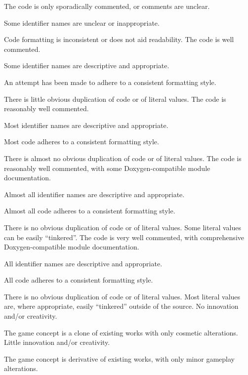 \documentclass{../fal_assignment}
\begin{document}
\begin{markingrubric}
        \grade The code is only sporadically commented, or comments are unclear.
            \par Some identifier names are unclear or inappropriate.
            \par Code formatting is inconsistent or does not aid readability.
        \grade The code is well commented.
            \par Some identifier names are descriptive and appropriate.
            \par An attempt has been made to adhere to a consistent formatting style.
             \par There is little obvious duplication of code or of literal values.           
        \grade The code is reasonably well commented.
            \par Most identifier names are descriptive and appropriate.
            \par Most code adheres to a consistent formatting style.
             \par There is almost no obvious duplication of code or of literal values.   
        \grade The code is reasonably well commented, with some Doxygen-compatible module documentation.
            \par Almost all identifier names are descriptive and appropriate.
            \par Almost all code adheres to a consistent formatting style.
             \par There is no obvious duplication of code or of literal values. Some literal values can be easily ``tinkered''. 
        \grade The code is very well commented, with comprehensive Doxygen-compatible module documentation.
            \par All identifier names are descriptive and appropriate.
            \par All code adheres to a consistent formatting style.
             \par There is no obvious duplication of code or of literal values. Most literal values are, where appropriate, easily ``tinkered'' outside of the source.  
%
        \grade\fail No innovation and/or creativity.
            \par The game concept is a clone of existing works with only cosmetic alterations.
        \grade Little innovation and/or creativity.
            \par The game concept is derivative of existing works, with only minor gameplay alterations.

\end{markingrubric}
\end{document}
